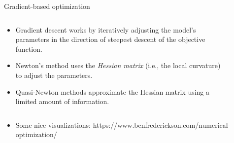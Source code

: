 \documentclass{beamer}
\begin{document}
\begin{frame}{Gradient-based optimization}
    \begin{columns}[T]
        \begin{column}{0.67\textwidth}
        \begin{itemize}
           \item Gradient descent works by iteratively adjusting the model's parameters in the direction of steepest descent of the objective function.\\[1ex]
           \item Newton's method uses the \emph{Hessian matrix} (i.e., the local curvature) to adjust the parameters.\\[1ex]
           \item Quasi-Newton methods approximate the Hessian matrix using a limited amount of information.
        \end{itemize}
        \end{column}
        \begin{column}{0.4\textwidth}
        \begin{figure}
\end{figure} 
        \end{column}
    \end{columns}
    \vspace{2ex}    
    \begin{itemize}
\item Some nice visualizations: https://www.benfrederickson.com/numerical-optimization/
\end{itemize}
\end{frame}
\end{document}
